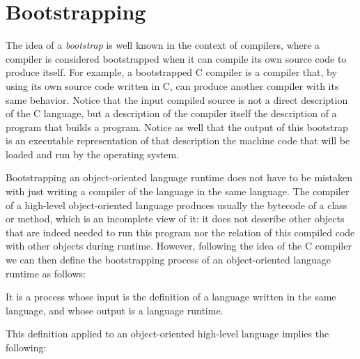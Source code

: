 \section{Bootstrapping}\label{sec:bootstrapping}

The idea of a \emph{bootstrap} is well known in the context of compilers, where a compiler is considered bootstrapped when it can compile its own source code to produce itself. For example, a bootstrapped C compiler is a compiler that, by using its own source code written in C, can produce another compiler with its same behavior. Notice that the input compiled source is not a direct description of the C language, but a description of the compiler itself \ie the description of a program that builds a program. Notice as well that the output of this bootstrap is an executable representation of that description \ie the machine code that will be loaded and run by the operating system.

Bootstrapping an object-oriented language runtime does not have to be mistaken with just writing a compiler of the language in the same language. The compiler of a high-level object-oriented language produces usually the bytecode of a class or method, which is an incomplete view of it: it does not describe other objects that are indeed needed to run this program nor the relation of this compiled code with other objects during runtime. However, following the idea of the C compiler we can then define the bootstrapping process of an object-oriented language runtime as follows:

\begin{definition}
It is a process whose input is the definition of a language written in the same language, and whose output is a language runtime.
\end{definition}

This definition applied to an object-oriented high-level language implies the following:

